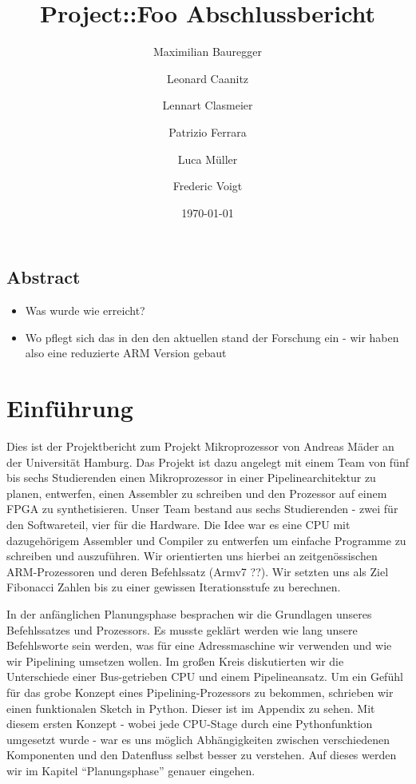 \documentclass[paper=a4,fontsize=12pt,twocolumn]{scrreprt}
\title{Project::Foo Abschlussbericht}
\author{Maximilian Bauregger \and Leonard Caanitz \and Lennart Clasmeier \and Patrizio Ferrara \and Luca Müller \and Frederic Voigt}
\date{\today}
\begin{document}
\maketitle

\tableofcontents

\section*{Abstract}

\begin{itemize}
    \item Was wurde wie erreicht?
    \item Wo pflegt sich das in den den aktuellen stand der Forschung ein - wir haben also eine reduzierte ARM Version gebaut
\end{itemize}
\kant[1]


\chapter{Einführung}
Dies ist der Projektbericht zum Projekt Mikroprozessor von Andreas Mäder an der Universität Hamburg. %
Das Projekt ist dazu angelegt mit einem Team von fünf bis sechs Studierenden einen Mikroprozessor in einer Pipelinearchitektur zu planen, entwerfen, einen Assembler zu schreiben und den Prozessor  auf einem FPGA zu synthetisieren.
Unser Team bestand aus sechs Studierenden - zwei für den Softwareteil, vier für die Hardware.
Die Idee war es eine CPU mit dazugehörigem Assembler und Compiler zu entwerfen um einfache Programme zu schreiben und auszuführen.
Wir orientierten uns hierbei an zeitgenössischen ARM-Prozessoren und deren Befehlssatz (Armv7 ??).
Wir setzten uns als Ziel Fibonacci Zahlen bis zu einer gewissen Iterationsstufe zu berechnen.

In der anfänglichen Planungsphase besprachen wir die Grundlagen unseres Befehlssatzes und Prozessors.
Es musste geklärt werden wie lang unsere Befehlsworte sein werden, was für eine Adressmaschine wir verwenden und wie wir Pipelining umsetzen wollen.
Im großen Kreis diskutierten wir die Unterschiede einer Bus-getrieben CPU und einem Pipelineansatz.
Um ein Gefühl für das grobe Konzept eines Pipelining-Prozessors zu bekommen, schrieben wir einen funktionalen Sketch in Python.
Dieser ist im Appendix zu sehen.
Mit diesem ersten Konzept - wobei jede CPU-Stage durch eine Pythonfunktion umgesetzt wurde - war es uns möglich Abhängigkeiten zwischen verschiedenen Komponenten und den Datenfluss selbst besser zu verstehen.
Auf dieses werden wir im Kapitel \enquote{Planungsphase} genauer eingehen.
\end{document}
